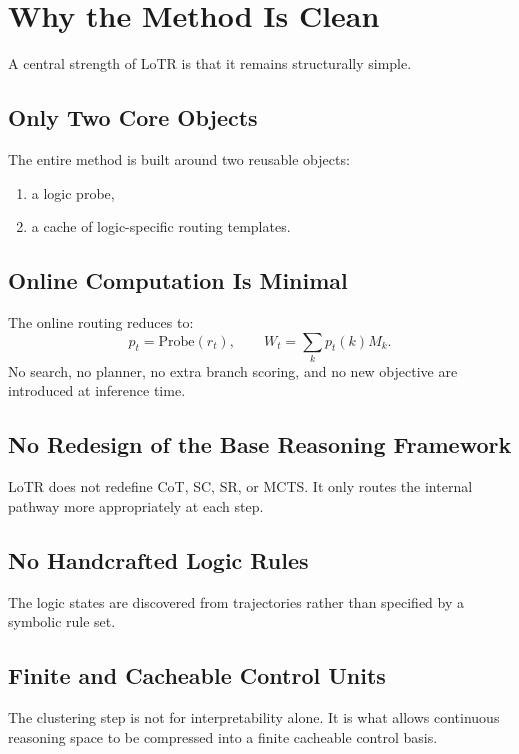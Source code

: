 \documentclass[11pt]{article}
\begin{document}
\section{Why the Method Is Clean}

A central strength of LoTR is that it remains structurally simple.

\subsection{Only Two Core Objects}

The entire method is built around two reusable objects:
\begin{enumerate}[leftmargin=1.5em]
    \item a logic probe,
    \item a cache of logic-specific routing templates.
\end{enumerate}

\subsection{Online Computation Is Minimal}

The online routing reduces to:
\[
p_t = \mathrm{Probe}(r_t), \qquad
W_t = \sum_k p_t(k)M_k.
\]
No search, no planner, no extra branch scoring, and no new objective are introduced at inference time.

\subsection{No Redesign of the Base Reasoning Framework}

LoTR does not redefine CoT, SC, SR, or MCTS. It only routes the internal pathway more appropriately at each step.

\subsection{No Handcrafted Logic Rules}

The logic states are discovered from trajectories rather than specified by a symbolic rule set.

\subsection{Finite and Cacheable Control Units}

The clustering step is not for interpretability alone. It is what allows continuous reasoning space to be compressed into a finite cacheable control basis.
\end{document}
